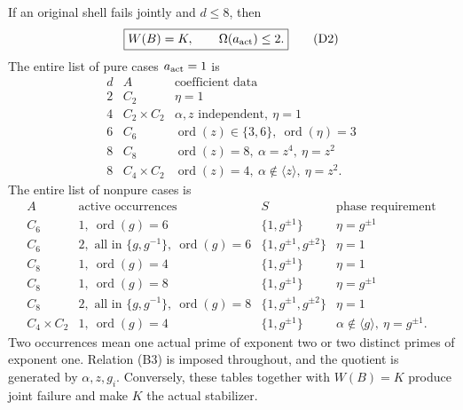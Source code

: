 \begin{theorem}\label{thm:low}
If an original shell fails jointly and $d\le8$, then
\[
 \boxed{W(B)=K,\qquad \Omega(a_{\rm act})\le2.}           \tag{D2}
\]
The entire list of pure cases $a_{\rm act}=1$ is
\[
\begin{array}{c|c|l}
 d&A&\text{coefficient data}\\\hline
 2&C_2&\eta=1\\
 4&C_2\times C_2&\alpha,z\text{ independent},\ \eta=1\\
 6&C_6&\operatorname{ord}(z)\in\{3,6\},\ \operatorname{ord}(\eta)=3\\
 8&C_8&\operatorname{ord}(z)=8,\ \alpha=z^4,\ \eta=z^2\\
 8&C_4\times C_2&\operatorname{ord}(z)=4,\ \alpha\notin\langle z\rangle,\ \eta=z^2.
\end{array}                                                   \tag{D3}
\]
The entire list of nonpure cases is
\[
\begin{array}{c|c|c|c}
 A&\text{active occurrences}&S&\text{phase requirement}\\\hline
 C_6&1,\ \operatorname{ord}(g)=6&\{1,g^{\pm1}\}&\eta=g^{\pm1}\\
 C_6&2,\text{ all in }\{g,g^{-1}\},\ \operatorname{ord}(g)=6
     &\{1,g^{\pm1},g^{\pm2}\}&\eta=1\\
 C_8&1,\ \operatorname{ord}(g)=4&\{1,g^{\pm1}\}&\eta=1\\
 C_8&1,\ \operatorname{ord}(g)=8&\{1,g^{\pm1}\}&\eta=g^{\pm1}\\
 C_8&2,\text{ all in }\{g,g^{-1}\},\ \operatorname{ord}(g)=8
     &\{1,g^{\pm1},g^{\pm2}\}&\eta=1\\
 C_4\times C_2&1,\ \operatorname{ord}(g)=4&\{1,g^{\pm1}\}
     &\alpha\notin\langle g\rangle,\ \eta=g^{\pm1}.
\end{array}                                                   \tag{D4}
\]
Two occurrences mean one actual prime of exponent two or two distinct primes
of exponent one. Relation (B3) is imposed throughout, and the quotient is
generated by $\alpha,z,g_i$. Conversely, these tables together with $W(B)=K$
produce joint failure and make $K$ the actual stabilizer.
\end{theorem}
